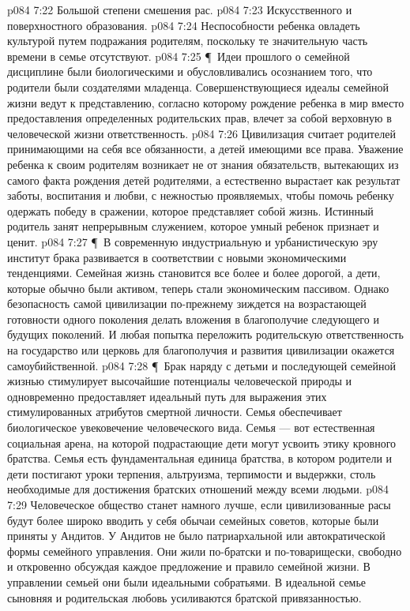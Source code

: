\vs p084 7:22 \bibnobreakspace Большой степени смешения рас.
\vs p084 7:23 \bibnobreakspace Искусственного и поверхностного образования.
\vs p084 7:24 \bibnobreakspace Неспособности ребенка овладеть культурой путем подражания родителям, поскольку те значительную часть времени в семье отсутствуют.
\vs p084 7:25 \P\ Идеи прошлого о семейной дисциплине были биологическими и обусловливались осознанием того, что родители были создателями младенца. Совершенствующиеся идеалы семейной жизни ведут к представлению, согласно которому рождение ребенка в мир вместо предоставления определенных родительских прав, влечет за собой верховную в человеческой жизни ответственность.
\vs p084 7:26 Цивилизация считает родителей принимающими на себя все обязанности, а детей имеющими все права. Уважение ребенка к своим родителям возникает не от знания обязательств, вытекающих из самого факта рождения детей родителями, а естественно вырастает как результат заботы, воспитания и любви, с нежностью проявляемых, чтобы помочь ребенку одержать победу в сражении, которое представляет собой жизнь. Истинный родитель занят непрерывным служением, которое умный ребенок признает и ценит.
\vs p084 7:27 \P\ В современную индустриальную и урбанистическую эру институт брака развивается в соответствии с новыми экономическими тенденциями. Семейная жизнь становится все более и более дорогой, а дети, которые обычно были активом, теперь стали экономическим пассивом. Однако безопасность самой цивилизации по\hyp{}прежнему зиждется на возрастающей готовности одного поколения делать вложения в благополучие следующего и будущих поколений. И любая попытка переложить родительскую ответственность на государство или церковь для благополучия и развития цивилизации окажется самоубийственной.
\vs p084 7:28 \P\ Брак наряду с детьми и последующей семейной жизнью стимулирует высочайшие потенциалы человеческой природы и одновременно предоставляет идеальный путь для выражения этих стимулированных атрибутов смертной личности. Семья обеспечивает биологическое увековечение человеческого вида. Семья --- вот естественная социальная арена, на которой подрастающие дети могут усвоить этику кровного братства. Семья есть фундаментальная единица братства, в котором родители и дети постигают уроки терпения, альтруизма, терпимости и выдержки, столь необходимые для достижения братских отношений между всеми людьми.
\vs p084 7:29 Человеческое общество станет намного лучше, если цивилизованные расы будут более широко вводить у себя обычаи семейных советов, которые были приняты у Андитов. У Андитов не было патриархальной или автократической формы семейного управления. Они жили по\hyp{}братски и по\hyp{}товарищески, свободно и откровенно обсуждая каждое предложение и правило семейной жизни. В управлении семьей они были идеальными собратьями. В идеальной семье сыновняя и родительская любовь усиливаются братской привязанностью.
